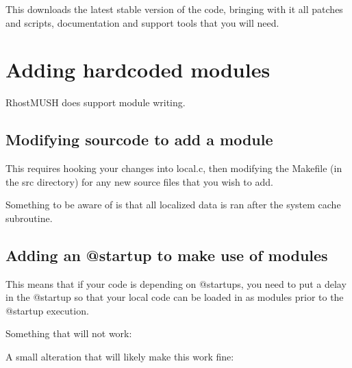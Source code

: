 \documentclass[letterpaper,10pt,english]{sphinxmanual}
\begin{document}
\sphinxAtStartPar
This downloads the latest stable version of the code, bringing with it all patches and scripts, documentation and support tools that you will need.


\section{Adding hardcoded modules}
\label{\detokenize{advanced:adding-hardcoded-modules}}
\sphinxAtStartPar
RhostMUSH does support module writing.


\subsection{Modifying sourcode to add a module}
\label{\detokenize{advanced:modifying-sourcode-to-add-a-module}}
\sphinxAtStartPar
This requires hooking your changes into local.c, then modifying the Makefile (in the src directory)
for any new source files that you wish to add.

\sphinxAtStartPar
Something to be aware of is that all localized data is ran after the system cache subroutine.


\subsection{Adding an @startup to make use of modules}
\label{\detokenize{advanced:adding-an-startup-to-make-use-of-modules}}
\sphinxAtStartPar
This means that if your code is depending on @startups, you need to put a delay in the @startup
so that your local code can be loaded in as modules prior to the @startup execution.

\sphinxAtStartPar
Something that will not work:

\begin{sphinxVerbatim}[commandchars=\\\{\}]
  
\end{sphinxVerbatim}

\sphinxAtStartPar
A small alteration that will likely make this work fine:

\begin{sphinxVerbatim}[commandchars=\\\{\}]
   
\end{sphinxVerbatim}
\end{document}
